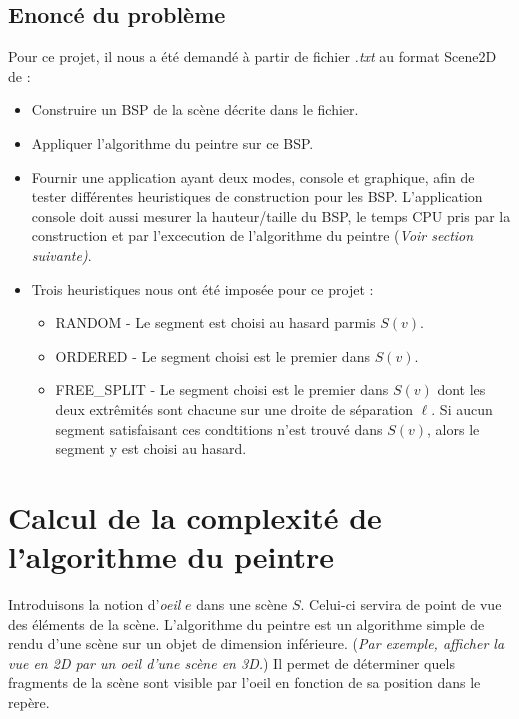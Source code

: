 \documentclass[11pts]{article}
\begin{document}
\subsection{Enoncé du problème}
Pour ce projet, il nous a été demandé à partir de fichier \emph{.txt} au format Scene2D de :
\begin{itemize}
\item Construire un BSP de la scène décrite dans le fichier.
\item Appliquer l'algorithme du peintre sur ce BSP.
\item Fournir une application ayant deux modes, console et graphique, afin de tester différentes heuristiques de construction pour les BSP. L'application console doit aussi mesurer la hauteur/taille du BSP, le temps CPU pris par la construction et par l'excecution de l'algorithme du peintre (\emph{Voir section suivante)}.
\item Trois heuristiques nous ont été imposée pour ce projet :
\begin{itemize}
\item RANDOM - Le segment est choisi au hasard parmis $S(v)$.
\item ORDERED - Le segment choisi est le premier dans $S(v)$.
\item FREE\_SPLIT - Le segment choisi est le premier dans $S(v)$ dont les deux extrêmités sont chacune sur une droite de séparation $\ell$. Si aucun segment satisfaisant ces condtitions n'est trouvé dans $S(v)$, alors le segment y est choisi au hasard.
\end{itemize}
\end{itemize}

\newpage
\section{Calcul de la complexité de l'algorithme du peintre}
Introduisons la notion d'\emph{oeil} $e$ dans une scène $S$. Celui-ci servira de point de vue des éléments de la scène. L'algorithme du peintre est un algorithme simple de rendu d'une scène sur un objet de dimension inférieure. (\emph{Par exemple, afficher la vue en 2D par un oeil d'une scène en 3D.}) Il permet de déterminer quels fragments de la scène sont visible par l'oeil en fonction de sa position dans le repère.
\end{document}
